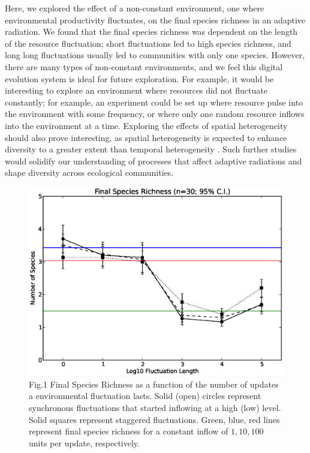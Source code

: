 \documentclass[10pt]{article}
\begin{document}
Here, we explored the effect of a non-constant environment, one where environmental productivity fluctuates, on the final species richness in an adaptive radiation. We found that the final species richness was dependent on the length of the resource fluctuation; short fluctuations led to high species richness, and long long fluctuations usually led to communities with only one species. However, there are many types of non-constant environments, and we feel this digital evolution system is ideal for future exploration. For example, it would be interesting to explore an environment where resources did not fluctuate constantly; for example, an experiment could be set up where resource pulse into the environment with some frequency, or where only one random resource inflows into the environment at a time. Exploring the effects of spatial heterogeneity should also prove interesting, as spatial heterogeneity is expected to enhance diversity to a greater extent than temporal heterogeneity \cite{kassen2002experimental}. Such further studies would solidify our understanding of processes that affect adaptive radiations and shape diversity across ecological communities.



\begin{figure}[h!]
\begin{center}
\includegraphics[width=0.7\columnwidth]{figures/fig_1_species_richness2/fig_1_species_richness2.eps}
\caption{Fig.1 Final Species Richness as a function of the number of updates a environmental fluctuation lasts. Solid (open) circles represent synchronous fluctuations that started inflowing at a high (low) level. Solid squares represent staggered fluctuations. Green, blue, red lines represent final species richness for a constant inflow of $1,10,100$ units per update, respectively.}
\end{center}
\end{figure}
\end{document}
